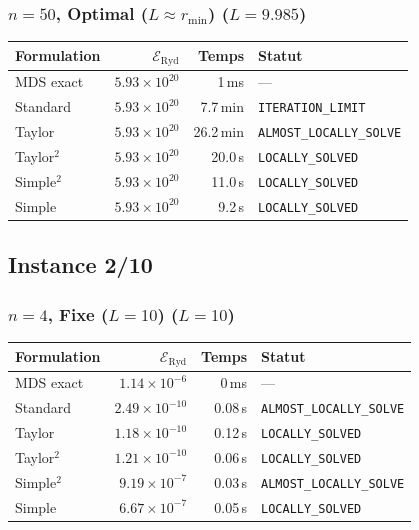 \subsubsection{$n=50$, Optimal ($L{\approx}r_{\min}$) ($L=9.985$)}
\begin{longtable}{@{}lrrl@{}}
  \toprule
  Formulation & $\mathcal{E}_{\mathrm{Ryd}}$ & Temps & Statut \\
  \midrule
  \endhead
  MDS exact & $5.93\times10^{20}$ & 1\,ms & --- \\
  Standard & $5.93\times10^{20}$ & 7.7\,min & \texttt{ITERATION\_LIMIT} \\
  Taylor & $5.93\times10^{20}$ & 26.2\,min & \texttt{ALMOST\_LOCALLY\_SOLVE} \\
  Taylor$^2$ & $5.93\times10^{20}$ & 20.0\,s & \texttt{LOCALLY\_SOLVED} \\
  Simple$^2$ & $5.93\times10^{20}$ & 11.0\,s & \texttt{LOCALLY\_SOLVED} \\
  Simple & $5.93\times10^{20}$ & 9.2\,s & \texttt{LOCALLY\_SOLVED} \\
  \bottomrule
\end{longtable}

\subsection{Instance 2/10}
\subsubsection{$n=4$, Fixe ($L{=}10$) ($L=10$)}
\begin{longtable}{@{}lrrl@{}}
  \toprule
  Formulation & $\mathcal{E}_{\mathrm{Ryd}}$ & Temps & Statut \\
  \midrule
  \endhead
  MDS exact & $1.14\times10^{-6}$ & 0\,ms & --- \\
  Standard & $2.49\times10^{-10}$ & 0.08\,s & \texttt{ALMOST\_LOCALLY\_SOLVE} \\
  Taylor & $1.18\times10^{-10}$ & 0.12\,s & \texttt{LOCALLY\_SOLVED} \\
  Taylor$^2$ & $1.21\times10^{-10}$ & 0.06\,s & \texttt{LOCALLY\_SOLVED} \\
  Simple$^2$ & $9.19\times10^{-7}$ & 0.03\,s & \texttt{ALMOST\_LOCALLY\_SOLVE} \\
  Simple & $6.67\times10^{-7}$ & 0.05\,s & \texttt{LOCALLY\_SOLVED} \\
  \bottomrule
\end{longtable}

